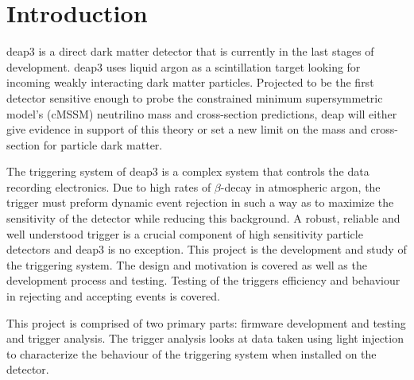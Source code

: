 \chapter{Introduction}
\gls{deap3} is a direct dark matter detector that is currently in the last stages of development. \gls{deap3} uses liquid argon as a scintillation target looking for incoming weakly interacting dark matter particles. Projected to be the first detector sensitive enough to probe the constrained minimum supersymmetric model's (cMSSM) neutrilino mass and cross-section predictions, \gls{deap} will either give evidence in support of this theory or set a new limit on the mass and cross-section for particle dark matter.

The triggering system of \gls{deap3} is a complex system that controls the data recording electronics. Due to high rates of $\beta$-decay in atmospheric argon, the trigger must preform dynamic event rejection in such a way as to maximize the sensitivity of the detector while reducing this background. A robust, reliable and well understood trigger is a crucial component of high sensitivity particle detectors and \gls{deap3} is no exception. This project is the development and study of the triggering system. The design and motivation is covered as well as the development process and testing. Testing of the triggers efficiency and behaviour in rejecting and accepting events is covered.

This project is comprised of two primary parts: firmware development and testing and trigger analysis. The trigger analysis looks at data taken using light injection to characterize the behaviour of the triggering system when installed on the detector.

 

